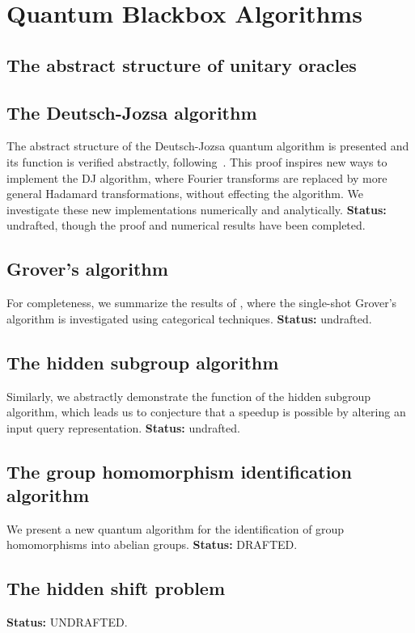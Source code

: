 \chapter{Quantum Blackbox Algorithms}

\todo{\chapabstract{}}

\section{The abstract structure of unitary oracles}

\section{The Deutsch-Jozsa algorithm}
The abstract structure of the Deutsch-Jozsa quantum algorithm is presented and its function is verified abstractly, following~\cite{vicary-tqa}. This proof inspires new ways to implement the DJ algorithm, where Fourier transforms are replaced by more general Hadamard transformations, without effecting the algorithm. We investigate these new implementations numerically and analytically. {\bf Status:} undrafted, though the proof and numerical results have been completed.

\section{Grover's algorithm}
For completeness, we summarize the results of \cite{vicary-tqa}, where the single-shot Grover's algorithm is investigated using categorical techniques. {\bf Status:} undrafted.

\section{The hidden subgroup algorithm}
Similarly, we abstractly demonstrate the function of the hidden subgroup algorithm, which leads us to conjecture that a speedup is possible by altering an input query representation. {\bf Status:} undrafted.

\section{\color{blue} The group homomorphism identification algorithm}
We present a new quantum algorithm for the identification of group homomorphisms into abelian groups. {\bf Status:} DRAFTED.

\section{\color{blue} The hidden shift problem}
{\bf Status:} UNDRAFTED.

